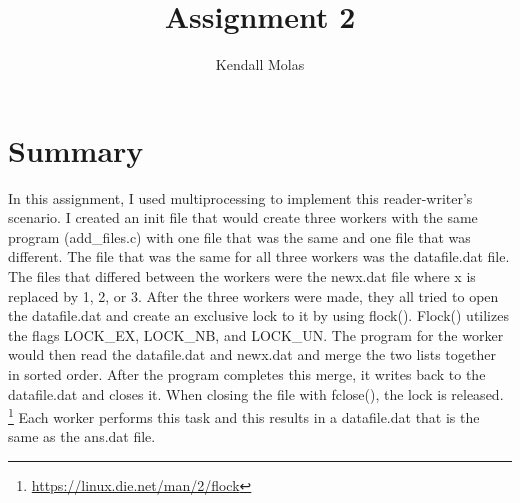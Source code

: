 \documentclass[a4paper,11pt]{report}
\title{Assignment 2}
\author{Kendall Molas}
\begin{document}
\maketitle

\section*{Summary}

In this assignment, I used multiprocessing to implement this reader-writer's scenario. I created an init file that would create three workers with the same program (add\_files.c) with one file that was the same and one file that was different. The file that was the same for all three workers was the datafile.dat file. The files that differed between the workers were the newx.dat file where x is replaced by 1, 2, or 3. After the three workers were made, they all tried to open the datafile.dat and create an exclusive lock to it by using flock(). Flock() utilizes the flags LOCK\_EX, LOCK\_NB, and LOCK\_UN. The program for the worker would then read the datafile.dat and newx.dat and merge the two lists together in sorted order. After the program completes this merge, it writes back to the datafile.dat and closes it. When closing the file with fclose(), the lock is released. \footnote{\url{https://linux.die.net/man/2/flock}} Each worker performs this task and this results in a datafile.dat that is the same as the ans.dat file. 
\end{document}
